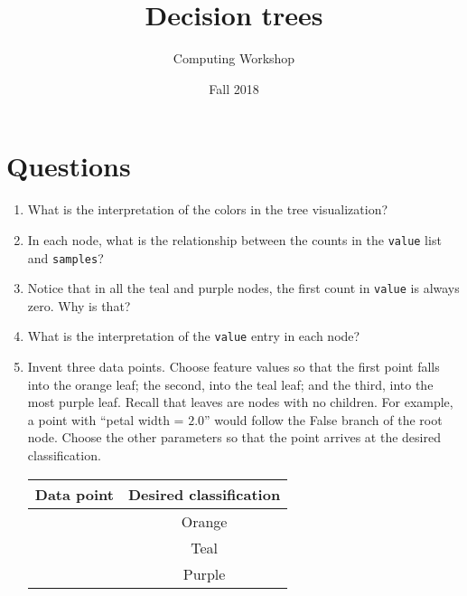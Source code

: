 \documentclass[11pt]{article}
\author{Computing Workshop}
\title{Decision trees}
\date{Fall 2018}
\begin{document}
\maketitle

\section*{Questions}

\begin{enumerate}
\item
  What is the interpretation of the colors in the tree visualization?
  \vspace{2em}

\item
  In each node, what is the relationship between the counts in the
  \texttt{value} list and \texttt{samples}?
  \vspace{2em}

\item
  Notice that in all the teal and purple nodes, the first count in
  \texttt{value} is always zero. Why is that?
  \vspace{2em}

\item
  What is the interpretation of the \texttt{value} entry in each node?
  \vspace{2em}

\item
  Invent three data points.
  Choose feature values so that the first point falls into the orange leaf; the
  second, into the teal leaf; and the third, into the most purple leaf. Recall
  that leaves are nodes with no children.
  For example, a point with ``petal width = $2.0$'' would follow the False
  branch of the root node. Choose the other parameters so that the point arrives
  at the desired classification.

  \begin{center}
    \renewcommand{\arraystretch}{1.5}
    \begin{tabular}{|p{14em}|c|}
      \hline
      \textbf{Data point} & \textbf{Desired classification} \\ \hline
      ~ & Orange \\ \hline
      ~ & Teal \\ \hline
      ~ & Purple \\ \hline
    \end{tabular}
  \end{center}
\end{enumerate}
\end{document}
